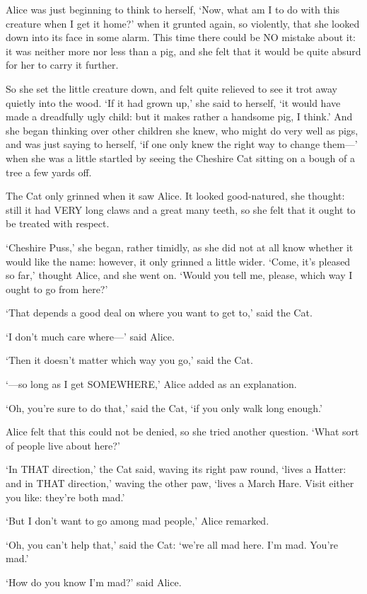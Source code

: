 \documentclass[12pt]{book}
\begin{document}
\begin{Parallel}[p]{}{}
{Alice was just beginning to think to herself, ‘Now, what am I to do with this creature when I get it home?’ when it grunted again, so violently, that she looked down into its face in some alarm. This time there could be NO mistake about it: it was neither more nor less than a pig, and she felt that it would be quite absurd for her to carry it further.

So she set the little creature down, and felt quite relieved to see it trot away quietly into the wood. ‘If it had grown up,’ she said to herself, ‘it would have made a dreadfully ugly child: but it makes rather a handsome pig, I think.’ And she began thinking over other children she knew, who might do very well as pigs, and was just saying to herself, ‘if one only knew the right way to change them—’ when she was a little startled by seeing the Cheshire Cat sitting on a bough of a tree a few yards off.

The Cat only grinned when it saw Alice. It looked good-natured, she thought: still it had VERY long claws and a great many teeth, so she felt that it ought to be treated with respect.

‘Cheshire Puss,’ she began, rather timidly, as she did not at all know whether it would like the name: however, it only grinned a little wider. ‘Come, it’s pleased so far,’ thought Alice, and she went on. ‘Would you tell me, please, which way I ought to go from here?’

‘That depends a good deal on where you want to get to,’ said the Cat.

‘I don’t much care where—’ said Alice.

‘Then it doesn’t matter which way you go,’ said the Cat.

‘—so long as I get SOMEWHERE,’ Alice added as an explanation.

‘Oh, you’re sure to do that,’ said the Cat, ‘if you only walk long enough.’

Alice felt that this could not be denied, so she tried another question. ‘What sort of people live about here?’

‘In THAT direction,’ the Cat said, waving its right paw round, ‘lives a Hatter: and in THAT direction,’ waving the other paw, ‘lives a March Hare. Visit either you like: they’re both mad.’

‘But I don’t want to go among mad people,’ Alice remarked.

‘Oh, you can’t help that,’ said the Cat: ‘we’re all mad here. I’m mad. You’re mad.’

‘How do you know I’m mad?’ said Alice.

}
\end{Parallel}
\end{document}

